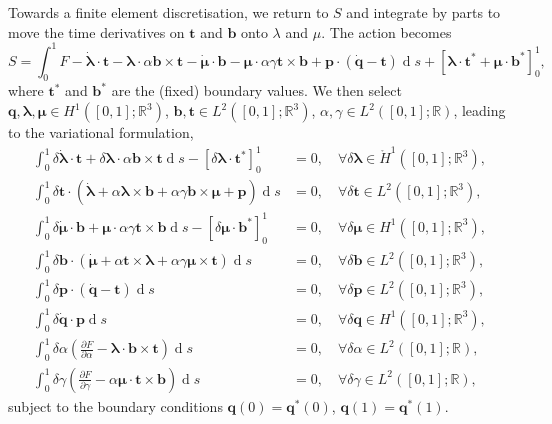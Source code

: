 \documentclass{article}
\def\MM#1{\boldsymbol{#1}}
\newcommand{\pp}[2]{\frac{\partial #1}{\partial #2}}
\def\MM#1{\boldsymbol{#1}}
\DeclareMathOperator{\diff}{d}
\begin{document}
Towards a finite element discretisation, we return to $S$ and integrate
by parts to move the time derivatives on $\MM{t}$ and $\MM{b}$ onto
$\lambda$ and $\mu$. The action becomes
\begin{equation}
  S = \int_0^1 F - \dot{\MM{\lambda}}\cdot\MM{t}
  -\MM{\lambda}\cdot\alpha\MM{b}\times\MM{t}
  - \dot{\MM{\mu}}\cdot\MM{b}
  -\MM{\mu}\cdot\alpha\gamma\MM{t}\times\MM{b}
  + \MM{p}\cdot\left(\dot{\MM{q}}-\MM{t}\right)\diff s
  + \left[\MM{\lambda}\cdot\MM{t}^* + \MM{\mu}\cdot\MM{b}^*
    \right]_0^1,
\end{equation}
where $\MM{t}^*$ and $\MM{b}^*$ are the (fixed) boundary values. We
then select $\MM{q},\MM{\lambda},\MM{\mu}\in H^1([0,1];\mathbb{R}^3)$,
$\MM{b},\MM{t}\in L^2([0,1];\mathbb{R}^3)$, $\alpha,\gamma\in
L^2([0,1];\mathbb{R})$, leading to the variational formulation,
\begin{align}
  \int_0^1 \delta \dot{\MM{\lambda}}\cdot\MM{t}
  +\delta\MM{\lambda}\cdot\alpha\MM{b}\times\MM{t}
  \diff s -
  \left[
    \delta\MM{\lambda}\cdot \MM{t}^*
    \right]_0^1
  & = 0, \quad \forall \delta\MM{\lambda} \in
  \mathring{H}^1([0,1];\mathbb{R}^3), \\
  \int_0^1 \delta \MM{t} \cdot
  \left(\dot{\MM{\lambda}} + \alpha\MM{\lambda}\times \MM{b}
  +\alpha\gamma \MM{b}\times\MM{\mu} + \MM{p}\right)\diff s & = 0,
  \quad \forall \delta\MM{t} \in L^2([0,1];\mathbb{R}^3), \\
  \int_0^1 \delta \dot{\MM{\mu}}\cdot{\MM{b}}
  +\MM{\mu}\cdot\alpha\gamma\MM{t}\times\MM{b}
  \diff s - \left[\delta\MM{\mu}\cdot\MM{b}^*
    \right]_0^1& = 0, \quad \forall \delta\MM{\mu} \in
  H^1([0,1];\mathbb{R}^3), \\
  \int_0^1 \delta \MM{b}\cdot \left(\dot{\MM{\mu}}
  +\alpha\MM{t}\times\MM{\lambda}
  +\alpha\gamma\MM{\mu}\times\MM{t}
  \right)\diff s & = 0, \quad \forall \delta\MM{b}\in L^2([0,1];\mathbb{R}^3), \\
  \int_0^1 \delta \MM{p}\cdot \left(\dot{\MM{q}}-\MM{t}\right)\diff s &= 0,
  \quad \forall \delta\MM{p}\in L^2([0,1];\mathbb{R}^3), \\
  \int_0^1 \delta\dot{\MM{q}}\cdot{\MM{p}}\diff s & = 0, \quad
  \forall \delta \MM{q} \in H^1([0,1];\mathbb{R}^3), \\
  \int_0^1 \delta\alpha\left(\pp{F}{\alpha}-\MM{\lambda}\cdot\MM{b}\times
  \MM{t}\right)\diff s & = 0, \quad \forall \delta\alpha\in L^2([0,1];
  \mathbb{R}), \\
  \int_0^1 \delta\gamma\left(\pp{F}{\gamma}-\alpha\MM{\mu}\cdot\MM{t}\times
  \MM{b}\right)\diff s & = 0, \quad \forall \delta\gamma \in L^2([0,1];
  \mathbb{R}),
\end{align}
subject to the boundary conditions $\MM{q}(0)=\MM{q}^*(0)$,
$\MM{q}(1)=\MM{q}^*(1)$.
\end{document}
